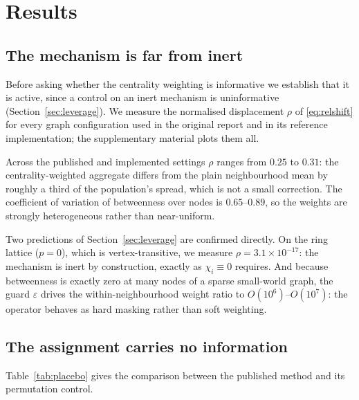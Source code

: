 \section{Results}
\label{sec:results}

\subsection{The mechanism is far from inert}
\label{sec:res:magnitude}

Before asking whether the centrality weighting is informative we establish that
it is active, since a control on an inert mechanism is uninformative
(Section~\ref{sec:leverage}). We measure the normalised displacement $\rho$ of
\eqref{eq:relshift} for every graph configuration used in the original report
and in its reference implementation; the supplementary material plots them all.

Across the published and implemented settings $\rho$ ranges from $0.25$ to
$0.31$: the centrality-weighted aggregate differs from the plain neighbourhood
mean by roughly a third of the population's spread, which is not a small
correction. The coefficient of variation of betweenness over nodes is
$0.65$--$0.89$, so the weights are strongly heterogeneous rather than
near-uniform.

Two predictions of Section~\ref{sec:leverage} are confirmed directly. On the
ring lattice ($p=0$), which is vertex-transitive, we measure
$\rho = 3.1\times10^{-17}$: the mechanism is inert by construction, exactly as
$\chi_i \equiv 0$ requires. And because betweenness is exactly zero at many
nodes of a sparse small-world graph, the guard $\varepsilon$ drives the
within-neighbourhood weight ratio to $O(10^{6})$--$O(10^{7})$: the operator
behaves as hard masking rather than soft weighting.

\subsection{The assignment carries no information}
\label{sec:res:placebo}

Table~\ref{tab:placebo} gives the comparison between
the published method and its permutation control.

